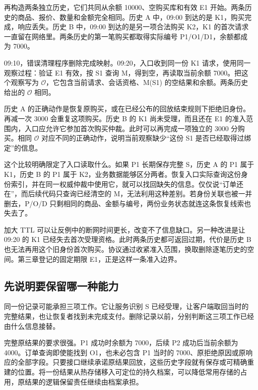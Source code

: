 再构造两条独立历史，它们共同从余额 10000、空购买库和有效 E1 开始。两条历史的商品、报价、数量和金额完全相同。历史 A 中，09:00 到达的是 K1，购买完成，响应丢失。历史 B 中，09:00 到达的是另一项合法购买 K2，K1 的首次请求一直留在网络里。两条历史的第一笔购买都取得实际编号 P1/O1/D1，余额都成为 7000。

09:10，错误清理程序删除完成映射。09:20，入口收到同一份 K1 请求，使用同一观察过程：验证 E1 有效，按 S1 查询 M，得到空，再读取当前余额 7000。把这个观察写为 $\mathcal O$，它包含当前请求、会话资格、M(S1) 的空结果和余额。两条历史给出的 $\mathcal O$ 相同。

历史 A 的正确动作是恢复原购买，或在已经公布的回放结束规则下拒绝旧身份。再减一次 3000 会重复这项购买。历史 B 的 K1 尚未受理，而且还在 E1 的准入范围内，入口应允许它参加首次购买仲裁。此时可以再完成一项独立的 3000 分购买。相同 $\mathcal O$ 对应不同的正确动作，说明当前观察缺少“这份 S1 是否已经取得过绑定”的信息。


这个比较明确限定了入口读取什么。如果 P1 长期保存完整 S，历史 A 的 P1 属于 K1，历史 B 的 P1 属于 K2，业务数据能够区分两者。恢复入口实际查询这份身份索引，并在同一权威仲裁中使用它，就可以找回缺失的信息。仅仅说“订单还在”，而后续代码只查询已经清空的 M，无法利用这种差别。若身份关联也被一并删去，P/O/D 只剩相同的商品、金额与编号，两份业务状态就连这条恢复线索也失去了。

加大 TTL 可以让反例中的断网时间更长，改变不了信息缺口。另一种改进是让 09:20 的 K1 已经失去首次受理资格。此时两条历史都可返回过期，代价是历史 B 也无法再用这个旧身份首次购买。协议通过收紧准入范围，换取删除逐笔历史的空间。第三章登记的固定期限 E1，正是这样一条准入边界。

\subsection*{先说明要保留哪一种能力}

同一份记录可能承担三项工作。它让服务识别 S 已经受理，让客户端取回当时的完整结果，也让恢复者找到未完成支付。删除记录以前，分别判断这三项工作已经由什么信息接替。

完整原结果的要求很强。P1 成功时余额为 7000，后续 P2 成功后当前余额为 4000。订单查询即使能找到 O1，也未必包含 P1 当时的 7000、原拒绝原因或原响应的全部字段。只要接口继续承诺原结果回放，这些历史字段就有保存或可精确重建的位置。将一份结果从热存储移入可定位的持久档案，可以降低常用存储的占用，原结果的逻辑保留责任继续由档案承担。

